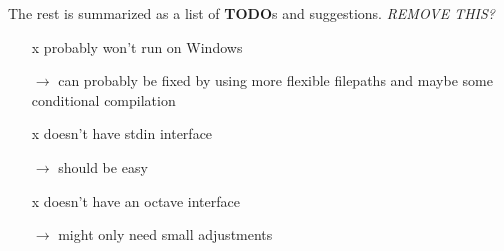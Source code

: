 The rest is summarized as a list of \textbf{TODO}s and suggestions.
\emph{REMOVE THIS?}

\begin{itemize} 
  
  \item[x] probably won't run on Windows

  \item[$\rightarrow$] can probably be fixed by using more flexible filepaths
    and maybe some conditional compilation

  \item[x] doesn't have stdin interface

  \item[$\rightarrow$] should be easy 

  \item[x] doesn't have an octave interface

  \item[$\rightarrow$] might only need small adjustments 

\end{itemize}
